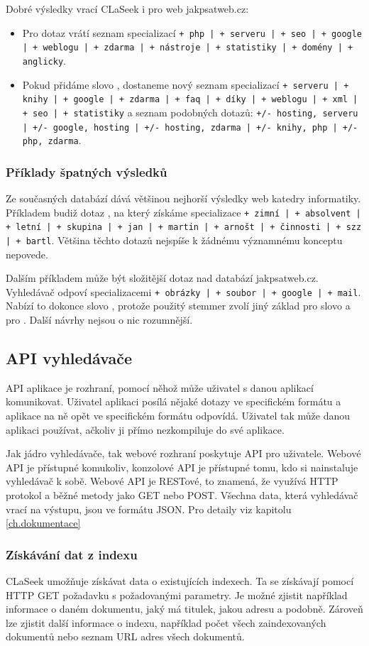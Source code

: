 \documentclass{article}
\newcommand{\name}{CLaSeek}
\newcommand{\code}[1]{\texttt{#1}}
\newcommand{\ssection}[1]{\subsection{#1}}
\newcommand{\sssection}[1]{\subsubsection{#1}}
\begin{document}
Dobré výsledky vrací \name{} i pro web jakpsatweb.cz: 

\begin{itemize}
	\item Pro dotaz  vrátí seznam specializací \code{+ php | + serveru | + seo | + google | + weblogu | + zdarma | + nástroje | + statistiky | + domény | + anglicky}. 
	\item Pokud přidáme slovo , dostaneme nový seznam specializací \code{+ serveru | + knihy | + google | + zdarma | + faq | + díky | + weblogu | + xml | + seo | + statistiky} a seznam podobných dotazů: \code{+/- hosting, serveru | +/- google, hosting | +/- hosting, zdarma | +/- knihy, php | +/- php, zdarma}.
\end{itemize}

\sssection{Příklady špatných výsledků}

Ze současných databází dává většinou nejhorší výsledky web katedry informatiky. Příkladem budiž dotaz , na který získáme specializace \code{+ zimní | + absolvent | + letní | + skupina | + jan | + martin | + arnošt | + činnosti | + szz | + bartl}. Většina těchto dotazů nejspíše k žádnému významnému konceptu nepovede. 

Dalším příkladem může být složitější dotaz  nad databází jakpsatweb.cz. Vyhledávač odpoví specializacemi \code{+ obrázky | + soubor | + google | + mail}. Nabízí to dokonce slovo , protože použitý stemmer zvolí jiný základ pro slovo  a pro . Další návrhy nejsou o nic rozumnější. 


\ssection{API vyhledávače}

API aplikace je rozhraní, pomocí něhož může uživatel s danou aplikací komunikovat. Uživatel aplikaci posílá nějaké dotazy ve specifickém formátu a aplikace na ně opět ve specifickém formátu odpovídá. Uživatel tak může danou aplikaci používat, ačkoliv ji přímo nezkompiluje do své aplikace.  

Jak jádro vyhledávače, tak webové rozhraní poskytuje API pro uživatele. Webové API je přístupné komukoliv, konzolové API je přístupné tomu, kdo si nainstaluje vyhledávač k sobě. Webové API je RESTové, to znamená, že využívá HTTP protokol a běžné metody jako GET nebo POST. Všechna data, která vyhledávač vrací na výstupu, jsou ve formátu JSON. Pro detaily viz kapitolu \ref{ch.dokumentace}

\sssection{Získávání dat z indexu}

\name{} umožňuje získávat data o existujících indexech. Ta se získávají pomocí HTTP GET požadavku s požadovanými parametry. Je možné zjistit například informace o daném dokumentu, jaký má titulek, jakou adresu a podobně. Zároveň lze zjistit další informace o indexu, například počet všech zaindexovaných dokumentů nebo seznam URL adres všech dokumentů.
\end{document}
